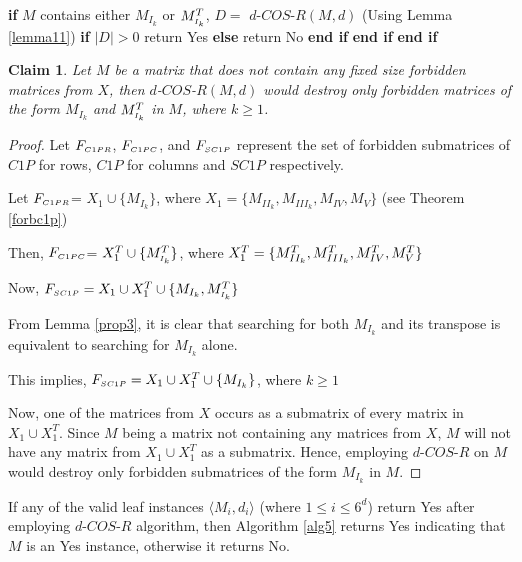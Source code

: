 \documentclass[review, 1p]{elsarticle}
\newtheorem{claim}{Claim}
\begin{document}
\begin{algorithm}[h]
\begin{algorithmic}[1]
\State \indent \textbf{if} {$M$ contains either $M_{I_{k}}$ or $M^{T}_{\mathsmaller{I_{k}}}$},\vspace{-0.05 in}
\State \indent \indent $D=$ $d$-$COS$-$R(M,d)$ (Using Lemma \ref{lemma11})\vspace{-0.05 in}
\State \indent \indent \textbf{if} {$\vert D \vert > 0$ }\vspace{-0.05 in}
\State \indent \indent \indent return Yes\vspace{-0.05 in}
\State \indent \indent \textbf{else}\vspace{-0.05 in}
\State  \indent \indent \indent return No\vspace{-0.05 in}
\State \indent \indent \textbf{end if}\vspace{-0.05 in}
\State \indent \textbf{end if}\vspace{-0.05 in}
\State \textbf{end if} \vspace{-0.05 in}
\end{algorithmic}
\end{algorithm}
\begin{claim}
Let $M$ be a matrix that does not contain any fixed size forbidden matrices from $X$, then $d$-$COS$-$R(M,d)$ would destroy only forbidden matrices of the form $M_{I_{k}}$ and $M^{T}_{\mathsmaller{I_{k}}}$ in $M$, where $k \geq 1$.
\end{claim}
\begin{proof}
Let $F_{\mathsmaller {C1PR}}$, $F_{\mathsmaller {C1PC}}$, and $F_{\mathsmaller {SC1P}}$ represent the set of forbidden submatrices of $C1P$ for rows, $C1P$ for columns and $SC1P$ respectively.

Let $F_{\mathsmaller {C1PR}}$= $X_{1} \cup \{M_{I_{k}}\}$, where $X_{1}=\{M_{II_{k}}, M_{III_{k}}, M_{IV}, M_{V}\}$ (see Theorem \ref{forbc1p})

Then, $F_{\mathsmaller {C1PC}}$= $X^{T}_{1} \cup \{M^{T}_{\mathsmaller{I_{k}}}\}$, where $X^{T}_{1}=\{M^{T}_{II_{k}}, M^{T}_{\tiny {III_{k}}}, M^{T}_{IV}, M^{T}_{V}\}$

Now, $F_{\mathsmaller {SC1P}}= X_{1} \cup X^{T}_{1} \cup \{M_{I_{k}}, M^{T}_{\mathsmaller{I_{k}}}\}$

\noindent From Lemma \ref{prop3}, it is clear that searching for both $M_{I_{k}}$ and its transpose is equivalent to searching for $M_{I_{k}}$ alone. 

This implies, $F_{\mathsmaller {SC1P}}= X_{1} \cup X^{T}_{1} \cup \{M_{I_{k}}\}$, where $k \geq 1$

Now, one of the matrices from $X$ occurs as a submatrix of every matrix in $X_{1} \cup X^{T}_{1}$. Since $M$ being a matrix not containing any matrices from $X$, $M$ will not have any matrix from $X_{1} \cup X^{T}_{1}$ as a submatrix. Hence, employing $d$-$COS$-$R$ on $M$ would destroy only forbidden submatrices of the form $M_{I_{k}}$ in $M$.
\end{proof}
If any of the valid leaf instances $\langle M_{i}, d_{i} \rangle$ (where $1 \leq i \leq 6^{d}$) return Yes after employing $d$-$COS$-$R$ algorithm, then Algorithm \ref{alg5} returns Yes indicating that $M$ is an Yes instance, otherwise it returns No. 
\end{document}

